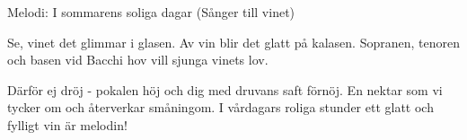 \begin{song}

\begin{songmeta}
Melodi: I sommarens soliga dagar (Sånger till vinet)
\end{songmeta}

\begin{songtext}
Se, vinet det glimmar i glasen.
Av vin blir det glatt på kalasen.
Sopranen, tenoren och basen
vid Bacchi hov vill sjunga vinets lov.

Därför ej dröj - pokalen höj
och dig med druvans saft förnöj.
En nektar som vi tycker om
och återverkar småningom.
I vårdagars roliga stunder
ett glatt och fylligt vin är melodin!
\end{songtext}
\end{song}
